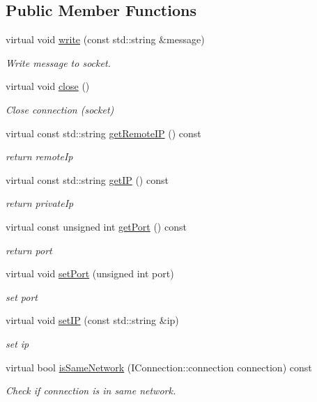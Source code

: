 \subsection*{Public Member Functions}
\begin{DoxyCompactItemize}
\item 
virtual void \hyperlink{class_connection_afab5a89f411c1a4050e27136e78ae0fe}{write} (const std\-::string \&message)
\begin{DoxyCompactList}\small\item\em Write message to socket. \end{DoxyCompactList}\item 
\hypertarget{class_connection_aea9f9d78e2b92747d4e4575ccb97361e}{virtual void \hyperlink{class_connection_aea9f9d78e2b92747d4e4575ccb97361e}{close} ()}\label{class_connection_aea9f9d78e2b92747d4e4575ccb97361e}

\begin{DoxyCompactList}\small\item\em Close connection (socket) \end{DoxyCompactList}\item 
virtual const std\-::string \hyperlink{class_connection_a6f607114a49fd0b3e28f81095f96ef70}{get\-Remote\-I\-P} () const 
\begin{DoxyCompactList}\small\item\em return remote\-Ip \end{DoxyCompactList}\item 
virtual const std\-::string \hyperlink{class_connection_ad57ac2e8a57f96f6aa5d19d508461c4c}{get\-I\-P} () const 
\begin{DoxyCompactList}\small\item\em return private\-Ip \end{DoxyCompactList}\item 
virtual const unsigned int \hyperlink{class_connection_ae6131694cd2ddb0642ae31a0be32c0f4}{get\-Port} () const 
\begin{DoxyCompactList}\small\item\em return port \end{DoxyCompactList}\item 
virtual void \hyperlink{class_connection_a22052c9cc1a32e779a7b719946092dc4}{set\-Port} (unsigned int port)
\begin{DoxyCompactList}\small\item\em set port \end{DoxyCompactList}\item 
virtual void \hyperlink{class_connection_aeaea6b4966b1202dc837973edd15aa80}{set\-I\-P} (const std\-::string \&ip)
\begin{DoxyCompactList}\small\item\em set ip \end{DoxyCompactList}\item 
virtual bool \hyperlink{class_connection_a0813f88a0a023e00ebcf206cd5780acb}{is\-Same\-Network} (I\-Connection\-::connection connection) const 
\begin{DoxyCompactList}\small\item\em Check if connection is in same network. \end{DoxyCompactList}\end{DoxyCompactItemize}
